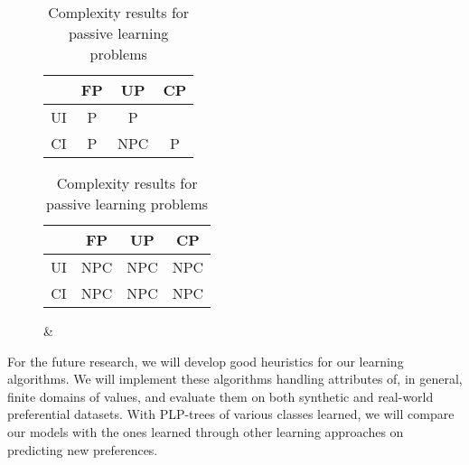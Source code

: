 \begin{table}[!ht]
	\centering
  \begin{subfigure}[b]{0.45\textwidth}
		\centering
		\begin{tabular}[0.45\textwidth]{ | c | c | c | c | }
		  \hline
		     & FP & UP & CP \\
		  \hline
		  UI & P & P & \tit{NP}\\
		  \hline
		  CI & P & NPC & P  \\
		  \hline
		\end{tabular}
		\caption{}
		\label{tbl:cons_learn}
	\end{subfigure}%
  \begin{subfigure}[b]{0.45\textwidth}
		\centering
		\begin{tabular}[0.45\textwidth]{ | c | c | c | c | }
		  \hline
		     & FP & UP & CP \\
		  \hline
		  UI & NPC & NPC & NPC \\
		  \hline
		  CI & NPC & NPC & NPC \\
		  \hline
		\end{tabular}
		\caption{ \& }
		\label{tbl:small_max_learn}
	\end{subfigure}
	\caption{Complexity results for passive learning problems}
	\label{tbl:comp_results}
\end{table}

For the future research, we will develop good heuristics for our learning algorithms.
We will implement these algorithms handling attributes of, in general, finite domains
of values, and evaluate them on both synthetic and
real-world preferential datasets. 
With PLP-trees of various classes learned, we will compare our models with
the ones learned through other learning approaches on predicting new preferences.
